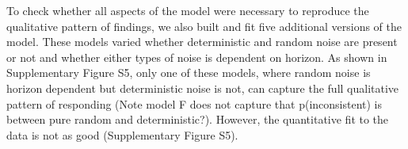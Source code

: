 \documentclass[12pt]{article}
\begin{document}
	To check whether all aspects of the model were necessary to reproduce the qualitative pattern of findings, we also built and fit five additional versions of the model.  These models varied whether deterministic and random noise are present or not and whether either types of noise is dependent on horizon. As shown in Supplementary Figure S5, only one of these models, where random noise is horizon dependent but deterministic noise is not, can capture the full qualitative pattern of responding (Note model F does not capture that  p(inconsistent) is between pure random and deterministic?). However, the quantitative fit to the data is not as good (Supplementary Figure S5).
	
	
	
		
	
	
\end{document}
